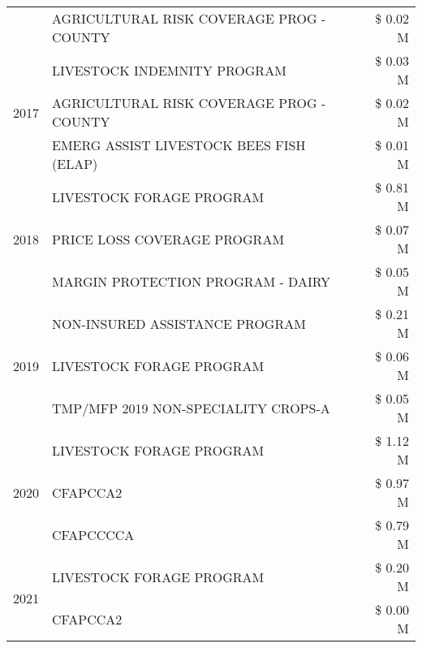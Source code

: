 \begin{tabular}{llr}
 & AGRICULTURAL RISK COVERAGE PROG - COUNTY & \$ 0.02 M \\
\cline{1-3}
\multirow[t]{3}{*}{2017} & LIVESTOCK INDEMNITY PROGRAM & \$ 0.03 M \\
 & AGRICULTURAL RISK COVERAGE PROG - COUNTY & \$ 0.02 M \\
 & EMERG ASSIST LIVESTOCK BEES FISH (ELAP) & \$ 0.01 M \\
\cline{1-3}
\multirow[t]{3}{*}{2018} & LIVESTOCK FORAGE PROGRAM & \$ 0.81 M \\
 & PRICE LOSS COVERAGE PROGRAM & \$ 0.07 M \\
 & MARGIN PROTECTION PROGRAM - DAIRY & \$ 0.05 M \\
\cline{1-3}
\multirow[t]{3}{*}{2019} & NON-INSURED ASSISTANCE PROGRAM & \$ 0.21 M \\
 & LIVESTOCK FORAGE PROGRAM & \$ 0.06 M \\
 & TMP/MFP 2019 NON-SPECIALITY CROPS-A & \$ 0.05 M \\
\cline{1-3}
\multirow[t]{3}{*}{2020} & LIVESTOCK FORAGE PROGRAM & \$ 1.12 M \\
 & CFAPCCA2 & \$ 0.97 M \\
 & CFAPCCCCA & \$ 0.79 M \\
\cline{1-3}
\multirow[t]{2}{*}{2021} & LIVESTOCK FORAGE PROGRAM & \$ 0.20 M \\
 & CFAPCCA2 & \$ 0.00 M \\
\cline{1-3}
\bottomrule
\end{tabular}
